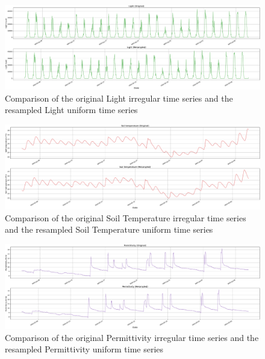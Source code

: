 \begin{figure}[htbp]
    \centering
    \includegraphics[width=15 cm]{5_ChapterDesign/figuras/5_Irregular/comparison_Light.pdf}
    \caption{Comparison of the original Light irregular time series and the resampled Light uniform time series}
    \label{comparison_Light}
\end{figure}

\begin{figure}[htbp]
    \centering
    \includegraphics[width=15 cm]{5_ChapterDesign/figuras/5_Irregular/comparison_Soil_temperature.pdf}
    \caption{Comparison of the original Soil Temperature irregular time series and the resampled Soil Temperature uniform time series}
    \label{comparison_Soil_temperature}
\end{figure}

\begin{figure}[htbp]
    \centering
    \includegraphics[width=15 cm]{5_ChapterDesign/figuras/5_Irregular/comparison_Permittivity.pdf}
    \caption{Comparison of the original Permittivity irregular time series and the resampled Permittivity uniform time series}
    \label{comparison_Permittivity}
\end{figure}

